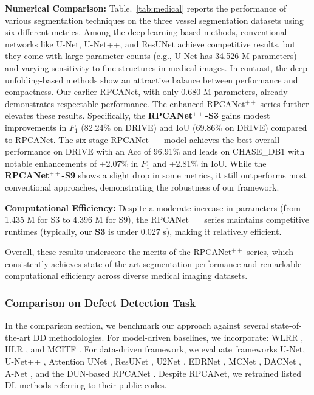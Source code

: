 \documentclass[10pt,journal,compsoc]{IEEEtran}
\begin{document}
\noindent \textbf{Numerical Comparison:}  
Table.~\ref{tab:medical} reports the performance of various segmentation techniques on the three vessel segmentation datasets using six different metrics. Among the deep learning-based methods, conventional networks like U-Net, U-Net++, and ResUNet achieve competitive results, but they come with large parameter counts (e.g., U-Net has 34.526 M parameters) and varying sensitivity to fine structures in medical images. In contrast, the deep unfolding-based methods show an attractive balance between performance and compactness. Our earlier RPCANet, with only 0.680 M parameters, already demonstrates respectable performance. The enhanced RPCANet$^{++}$ series further elevates these results. Specifically, the \textbf{RPCANet$^{++}$-S3} gains modest improvements in $F_1$ (82.24\% on DRIVE) and IoU (69.86\% on DRIVE) compared to RPCANet. The six-stage RPCANet$^{++}$ model achieves the best overall performance on DRIVE with an Acc of 96.91\% and leads on CHASE\_DB1 with notable enhancements of +2.07\% in $F_1$ and +2.81\% in IoU. While the \textbf{RPCANet$^{++}$-S9} shows a slight drop in some metrics, it still outperforms most conventional approaches, demonstrating the robustness of our framework.

\noindent \textbf{Computational Efficiency:} Despite a moderate increase in parameters (from 1.435 M for S3 to 4.396 M for S9), the RPCANet$^{++}$ series maintains competitive runtimes (typically, our \textbf{S3} is under 0.027 s), making it relatively efficient. 

Overall, these results underscore the merits of the RPCANet$^{++}$ series, which consistently achieves state-of-the-art segmentation performance and remarkable computational efficiency across diverse medical imaging datasets.

\subsubsection{Comparison on Defect Detection Task}
In the comparison section, we benchmark our approach against several state-of-the-art DD methodologies. For model-driven baselines, we incorporate: WLRR \cite{tang-2016-WLRR}, HLR \cite{zheng-2020-HLR}, and MCITF \cite{song-2020-MCITF}. For data-driven framework, we evaluate frameworks U-Net\cite{ronneberger-2015-unet}, U-Net++ \cite{zhou-2018-unetplusplus}, Attention UNet \cite{oktay-2018-attnunet}, ResUNet \cite{li-2019-resunet},  U2Net \cite{qin-2020-u2net}, EDRNet \cite{song-2020-edrnet}, MCNet \cite{zhang-2021-mcnet}, DACNet \cite{zhou-2022-dacnet}, A-Net \cite{chen-2024-anet}, and the DUN-based RPCANet \cite{wu-2024-rpcanet}. Despite RPCANet, we retrained listed DL methods referring to their public codes.
\end{document}
